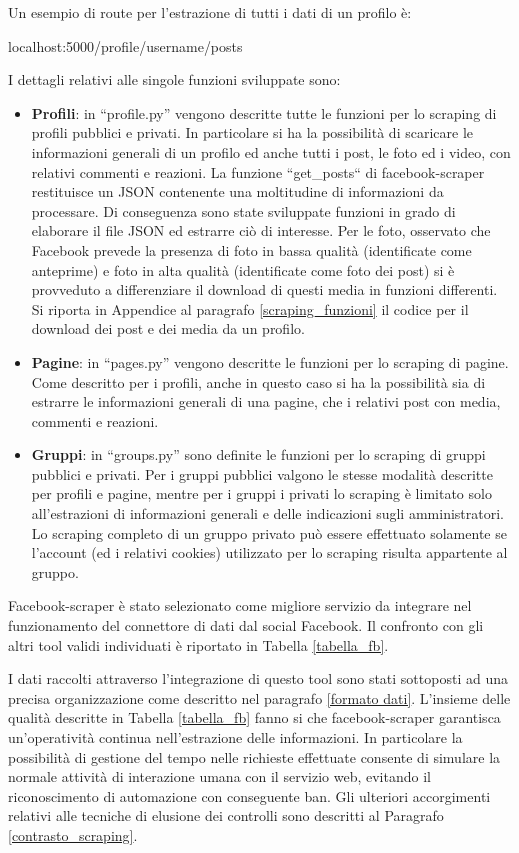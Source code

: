 Un esempio di route per l'estrazione di tutti i dati di un profilo \`e:
\begin{center}
    localhost:5000/profile/{username}/posts
\end{center}
I dettagli relativi alle singole funzioni sviluppate sono:
\begin{itemize}
    \item \textbf{Profili}: in ``profile.py'' vengono descritte tutte le funzioni per lo scraping di profili pubblici e privati. In particolare si ha la possibilit\`a di scaricare le informazioni generali di un profilo ed anche tutti i post, le foto ed i video, con relativi commenti e reazioni. 
    La funzione ``get\_posts`` di facebook-scraper restituisce un JSON contenente una moltitudine di informazioni da processare. Di conseguenza sono state sviluppate funzioni in grado di elaborare il file JSON ed estrarre ci\`o di interesse.
    Per le foto, osservato che Facebook prevede la presenza di foto in bassa qualit\`a (identificate come anteprime) e foto in alta qualit\`a (identificate come foto dei post) si \`e provveduto a differenziare il download di questi media in funzioni differenti.
    Si riporta in Appendice al paragrafo \ref{scraping_funzioni} il codice per il download dei post e dei media da un profilo.
    \item \textbf{Pagine}: in ``pages.py'' vengono descritte le funzioni per lo scraping di pagine. Come descritto per i profili, anche in questo caso si ha la possibilit\`a sia di estrarre le informazioni generali di una pagine, che i relativi post con media, commenti e reazioni.
    \item \textbf{Gruppi}: in ``groups.py'' sono definite le funzioni per lo scraping di gruppi pubblici e privati. Per i gruppi pubblici valgono le stesse modalit\`a descritte per profili e pagine, mentre per i gruppi i privati lo scraping \`e limitato solo all'estrazioni di informazioni generali e delle indicazioni sugli amministratori. Lo scraping completo di un gruppo privato pu\`o essere effettuato solamente se l'account (ed i relativi cookies) utilizzato per lo scraping risulta appartente al gruppo.
\end{itemize}
Facebook-scraper \`e stato selezionato come migliore servizio da integrare nel funzionamento del connettore di dati dal social Facebook. Il confronto con gli altri tool validi individuati \`e riportato in Tabella \ref{tabella_fb}.

I dati raccolti attraverso l'integrazione di questo tool sono stati sottoposti ad una precisa organizzazione come descritto nel paragrafo \ref{formato dati}.
L'insieme delle qualit\`a descritte in Tabella \ref{tabella_fb} fanno si che facebook-scraper garantisca un'operativit\`a continua nell'estrazione delle informazioni.
In particolare la possibilit\`a di gestione del tempo nelle richieste effettuate consente di simulare la normale attivit\`a di interazione umana con il servizio web, evitando il riconoscimento di automazione con conseguente ban.
Gli ulteriori accorgimenti relativi alle tecniche di elusione dei controlli sono descritti al Paragrafo \ref{contrasto_scraping}.


